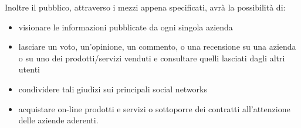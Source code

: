 \documentclass[12pt,a4paper]{article}
\begin{document}
Inoltre il pubblico, attraverso i mezzi appena specificati, avrà la possibilità di:
\begin{itemize}
 \item visionare le informazioni pubblicate da ogni singola azienda
 \item lasciare un voto, un'opinione, un commento, o una recensione su una azienda o su uno dei prodotti/servizi venduti e consultare quelli lasciati dagli altri utenti
 \item condividere tali giudizi sui principali social networks
 \item acquistare on-line prodotti e servizi o sottoporre dei contratti all'attenzione delle aziende aderenti.

\end{itemize}
\end{document}
